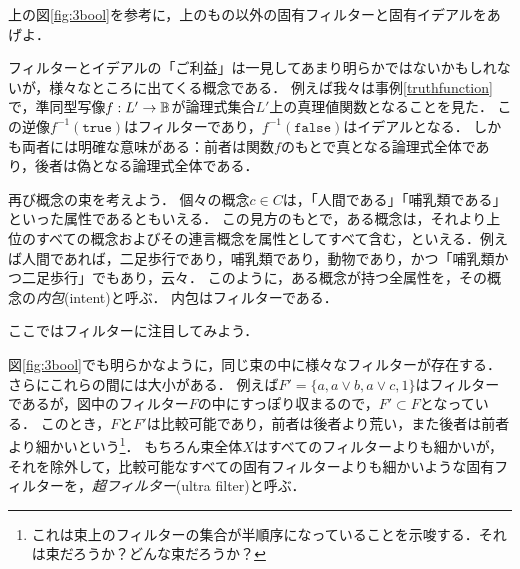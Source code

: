 \documentclass[11pt,a4paper]{jsarticle}
\begin{document}
\begin{exercise}
上の図\ref{fig:3bool}を参考に，上のもの以外の固有フィルターと固有イデアルをあげよ．
\end{exercise}

フィルターとイデアルの「ご利益」は一見してあまり明らかではないかもしれないが，様々なところに出てくる概念である．
例えば我々は事例\ref{truthfunction}で，準同型写像$f:L' \to \mathbb{B}$が論理式集合$L'$上の真理値関数となることを見た．
この逆像$f^{-1}(\texttt{true})$はフィルターであり，$f^{-1}(\texttt{false})$はイデアルとなる．
しかも両者には明確な意味がある：前者は関数$f$のもとで真となる論理式全体であり，後者は偽となる論理式全体である．

\begin{example}[概念の内包]
再び概念の束を考えよう．
個々の概念$c \in C$は，「人間である」「哺乳類である」といった属性であるともいえる．
この見方のもとで，ある概念は，それより上位のすべての概念およびその連言概念を属性としてすべて含む，といえる．例えば人間であれば，二足歩行であり，哺乳類であり，動物であり，かつ「哺乳類かつ二足歩行」でもあり，云々．
このように，ある概念が持つ全属性を，その概念の\emph{内包}(intent)と呼ぶ．
内包はフィルターである．
\end{example}


ここではフィルターに注目してみよう．


図\ref{fig:3bool}でも明らかなように，同じ束の中に様々なフィルターが存在する．
さらにこれらの間には大小がある．
例えば$F' = \{a, a\vee b, a \vee c, 1\}$はフィルターであるが，図中のフィルター$F$の中にすっぽり収まるので，$F' \subset F$となっている．
このとき，$F$と$F'$は比較可能であり，前者は後者より荒い，また後者は前者より細かいという\footnote{これは束上のフィルターの集合が半順序になっていることを示唆する．それは束だろうか？どんな束だろうか？}．
もちろん束全体$X$はすべてのフィルターよりも細かいが，それを除外して，比較可能なすべての固有フィルターよりも細かいような固有フィルターを，\emph{超フィルター}(ultra filter)と呼ぶ．
\end{document}
